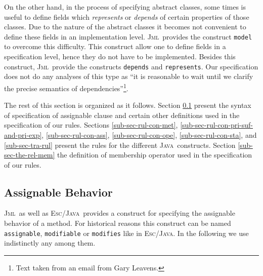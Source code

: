 \documentclass[a4paper]{llncs}
\newcommand{\jml}{\textsc{Jml}}
\newcommand{\escj}{\textsc{Esc/Java}}
\newcommand{\java}{\textsc{Java}}
\begin{document}
On the other hand, in the process of specifying abstract classes, some
times is useful to define fields
which \emph{represents} or \emph{depends} of certain properties of those
classes. Due to the nature of the abstract classes it becomes not
convenient to define these fields in an implementation
level. \jml~provides the construct \texttt{model} to overcome this
difficulty. This construct allow one to define fields in a
specification level, hence they do not have to be implemented. Besides 
this construct, \jml~provide the constructs
\texttt{depends} and \texttt{represents}. Our specification does not do any 
analyses of this type as ``it is reasonable to wait until we clarify
the precise semantics of dependencies''\footnote{Text taken from an
email from Gary Leavens.}.

The rest of this section is organized as it follows. Section
\ref{sub-sec-ass-beh} present the syntax of specification of
assignable clause and certain other definitions used in the
specification of our rules. Sections \ref{sub-sec-rul-con-met},
\ref{sub-sec-rul-con-pri-suf-and-pri-exp}, \ref{sub-sec-rul-con-ass},
\ref{sub-sec-rul-con-ope}, \ref{sub-sec-rul-con-sta}, and
\ref{sub-sec-tra-rul} present the rules for the different
\java~constructs. Section \ref{sub-sec-the-rel-mem} the definition of
membership operator used in the specification of our rules.






\subsection{Assignable Behavior}
\label{sub-sec-ass-beh}
\jml~as well as \escj~provides a construct for specifying the
assignable behavior of a method. For historical reasons this construct
can be named \texttt{assignable}, \texttt{modifiable} or
\texttt{modifies} like in \escj. In the following we use indistinctly
any among them. 
\end{document}
